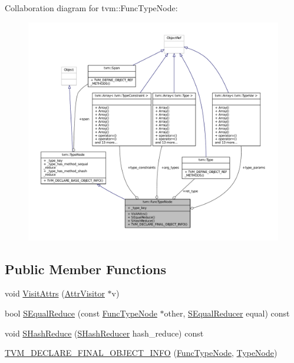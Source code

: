 Collaboration diagram for tvm\+:\+:Func\+Type\+Node\+:
\nopagebreak
\begin{figure}[H]
\begin{center}
\leavevmode
\includegraphics[width=350pt]{classtvm_1_1FuncTypeNode__coll__graph}
\end{center}
\end{figure}
\subsection*{Public Member Functions}
\begin{DoxyCompactItemize}
\item 
void \hyperlink{classtvm_1_1FuncTypeNode_af24e0e62007ea125a1150e18d8b3009e}{Visit\+Attrs} (\hyperlink{classtvm_1_1AttrVisitor}{Attr\+Visitor} $\ast$v)
\item 
bool \hyperlink{classtvm_1_1FuncTypeNode_a948d4107485982ea371fae189f7f0d2e}{S\+Equal\+Reduce} (const \hyperlink{classtvm_1_1FuncTypeNode}{Func\+Type\+Node} $\ast$other, \hyperlink{classtvm_1_1SEqualReducer}{S\+Equal\+Reducer} equal) const 
\item 
void \hyperlink{classtvm_1_1FuncTypeNode_a854174cec06c0d4f3fdb5c621d533193}{S\+Hash\+Reduce} (\hyperlink{classtvm_1_1SHashReducer}{S\+Hash\+Reducer} hash\+\_\+reduce) const 
\item 
\hyperlink{classtvm_1_1FuncTypeNode_a71a9ad8adac8816aa61c3c8851765d04}{T\+V\+M\+\_\+\+D\+E\+C\+L\+A\+R\+E\+\_\+\+F\+I\+N\+A\+L\+\_\+\+O\+B\+J\+E\+C\+T\+\_\+\+I\+N\+FO} (\hyperlink{classtvm_1_1FuncTypeNode}{Func\+Type\+Node}, \hyperlink{classtvm_1_1TypeNode}{Type\+Node})
\end{DoxyCompactItemize}
